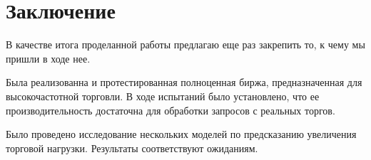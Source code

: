 \section{Заключение}

В качестве итога проделанной работы предлагаю еще раз закрепить то, к чему мы пришли в ходе нее.

Была реализованна и протестированная полноценная биржа, предназначенная для высокочастотной торговли. В ходе испытаний было установлено, что ее производительность достаточна для обработки запросов с реальных торгов.

Было проведено исследование нескольких моделей по предсказанию увеличения торговой нагрузки. Результаты соответствуют ожиданиям.

